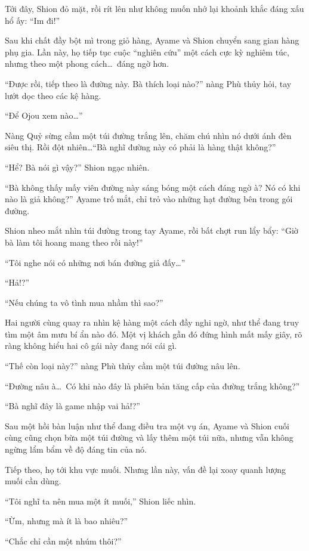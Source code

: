 \documentclass[../main.tex]{subfiles}
\begin{document}
Tới đây, Shion đỏ mặt, rồi rít lên như không muốn nhớ lại khoảnh khắc đáng xấu hổ ấy: ``Im đi!''

\ct

Sau khi chất đầy bột mì trong giỏ hàng, Ayame và Shion chuyển sang gian hàng phụ gia. Lần này, họ tiếp tục cuộc ``nghiên cứu'' một cách cực kỳ nghiêm túc, nhưng theo một phong cách\dots\ đáng ngờ hơn.

``Được rồi, tiếp theo là đường này. Bà thích loại nào?'' nàng Phù thủy hỏi, tay lướt dọc theo các kệ hàng.

``Để Ojou xem nào\dots''

Nàng Quỷ sừng cầm một túi đường trắng lên, chăm chú nhìn nó dưới ánh đèn siêu thị. Rồi đột nhiên\dots ``Bà nghĩ đường này có phải là hàng thật không?''

``Hể? Bà nói gì vậy?'' Shion ngạc nhiên.

``Bà không thấy mấy viên đường này sáng bóng một cách đáng ngờ à? Nó có khi nào là giả không?'' Ayame trố mắt, chỉ trỏ vào những hạt đường bên trong gói đường.

Shion nheo mắt nhìn túi đường trong tay Ayame, rồi bất chợt run lẩy bẩy: ``Giờ bà làm tôi hoang mang theo rồi này!''

``Tôi nghe nói có những nơi bán đường giả đấy\dots''

``Hả!?''

``Nếu chúng ta vô tình mua nhầm thì sao?''

Hai người cùng quay ra nhìn kệ hàng một cách đầy nghi ngờ, như thể đang truy tìm một âm mưu bí ẩn nào đó. Một vị khách gần đó đứng hình mất mấy giây, rõ ràng không hiểu hai cô gái này đang nói cái gì.

``Thế còn loại này?'' nàng Phù thủy cầm một túi đường nâu lên.

``Đường nâu à\dots\ Có khi nào đây là phiên bản tăng cấp của đường trắng không?''

``Bà nghĩ đây là game nhập vai hả!?''

Sau một hồi bàn luận như thể đang điều tra một vụ án, Ayame và Shion cuối cùng cũng chọn bừa một túi đường và lấy thêm một túi nữa, nhưng vẫn không ngừng lẩm bẩm về độ đáng tin của nó.

Tiếp theo, họ tới khu vực muối. Nhưng lần này, vấn đề lại xoay quanh lượng muối cần dùng.

``Tôi nghĩ ta nên mua một ít muối,'' Shion liếc nhìn.

``Ừm, nhưng mà ít là bao nhiêu?''

``Chắc chỉ cần một nhúm thôi?''
\end{document}
